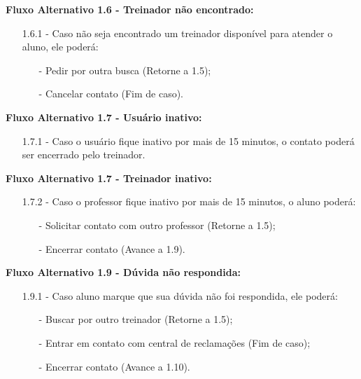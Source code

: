 \documentclass{article}
\begin{document}
    \textbf{Fluxo Alternativo 1.6 - Treinador não encontrado:}
    
    \begin{itemize}
        \item[1.6.1 -]  Caso não seja encontrado um treinador disponível para atender o aluno, ele poderá:

        \begin{itemize}
            \item[-] Pedir por outra busca (Retorne a 1.5);
            \item[-] Cancelar contato (Fim de caso).
        \end{itemize}
    \end{itemize}

    \textbf{Fluxo Alternativo 1.7 - Usuário inativo:}

    \begin{itemize}
        \item[1.7.1 -] Caso o usuário fique inativo por mais de 15 minutos, o contato poderá ser encerrado pelo treinador.
    \end{itemize}
    \newpage
    \textbf{Fluxo Alternativo 1.7 - Treinador inativo:}

    \begin{itemize}
        \item[1.7.2 -] Caso o professor fique inativo por mais de 15 minutos, o aluno poderá:
        
        \begin{itemize}
             \item[-] Solicitar contato com outro professor (Retorne a 1.5);
             \item[-] Encerrar contato (Avance a 1.9).
        \end{itemize}
    \end{itemize}

    \textbf{Fluxo Alternativo 1.9 - Dúvida não respondida:}

    \begin{itemize}
        \item[1.9.1 -] Caso aluno marque que sua dúvida não foi respondida, ele poderá:

        \begin{itemize}
             \item[-] Buscar por outro treinador (Retorne a 1.5);
             \item[-] Entrar em contato com central de reclamações (Fim de caso);
             \item[-] Encerrar contato (Avance a 1.10).
         \end{itemize}
    \end{itemize}
\end{document}
